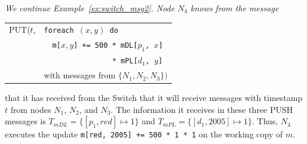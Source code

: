 \begin{example}\em
\label{ex:switch_msg3}
We continue Example~\ref{ex:switch_msg2}.
Node $N_4$ knows from the message
\begin{center}
\begin{tabular}{ll}
PUT($t$,   & {\tt foreach $(x,y)$ do} \\
           & ~~{\tt m[$x,y$] += 500 * mDL[$p_1$, $x$]} \\
           & ~~{\tt ~~~~~~~~~~~~~ * mPL[$d_1$, $y$]} \\
           & with messages from $\{N_1, N_2, N_3\})$
\end{tabular}
\end{center}
that it has received from the Switch
that it will receive messages with timestamp $t$ from nodes $N_1$, $N_2$, and
$N_3$.
The information it receives in these three PUSH messages is
$T_{mDL} = \{ [p_1, red] \mapsto 1 \}$ and
$T_{mPL} = \{ [d_1, 2005] \mapsto 1 \}$.
Thus, $N_4$ executes the update
{\tt m[red, 2005] += 500 * 1 * 1}
on the working copy of $m$. 
\punto
\end{example}

